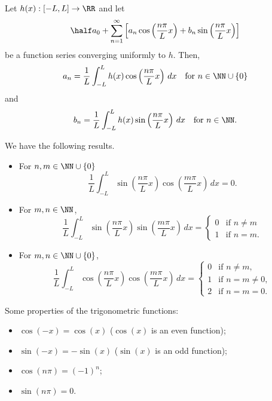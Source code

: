 \documentclass[12pt, a4paper]{article}
\begin{document}
\begin{proposition}
    Let \(h(x) : [-L,L] \to \RR\) and let 
    \[\half a_0 + \sum_{n=1}^{\infty} \left[ a_n \cos\left( \frac{n\pi}{L}x \right)+ b_n \sin \left( \frac{n\pi}{L}x \right) \right]\]
    be a function series converging uniformly to \(h\). Then,
    \[a_n = \frac{1}{L} \int_{-L}^L h(x) \cos\left( \frac{n\pi}{L}x \right) \, dx \quad \text{for } n \in \NN \cup \{0\}\]
    and
    \[b_n =\frac{1}{L} \int_{-L}^L h(x) \sin \left( \frac{n\pi}{L}x \right) \, dx \quad \text{for } n \in \NN.\]
\end{proposition}

\begin{mdlemma}
    We have the following results.
    \begin{itemize}
        \item For \(n,m \in \NN \cup \{0\}\)
        \[\frac{1}{L} \int_{-L}^L \sin \left( \frac{n\pi}{L}x \right) \cos\left( \frac{m\pi}{L}x \right) \, dx =0.\]
        \item For \(m,n \in \NN\),
        \[\frac{1}{L} \int_{-L}^{L} \sin\left( \frac{n\pi}{L}x\right)\sin\left( \frac{m\pi}{L}x \right) \, dx= \begin{cases}
            0 & \text{if } n\neq m \\
            1 & \text{if } n=m.
        \end{cases}\]
        \item For \(m,n \in \NN \cup \{0\}\),
        \[\frac{1}{L} \int_{-L}^{L} \cos\left( \frac{n\pi}{L}x \right) \cos\left( \frac{m\pi}{L}x \right) \, dx =\begin{cases}
            0 & \text{if } n\neq m, \\
            1 & \text{if } n=m\neq 0, \\
            2 & \text{if } n=m=0.
        \end{cases}\]
    \end{itemize}
\end{mdlemma}

\begin{mdlemma}
    Some properties of the trigonometric functions:
    \begin{itemize}
        \item \(\cos(-x)=\cos(x)\) (\(\cos(x)\) is an even function);
        \item \(\sin(-x)=-\sin(x)\) (\(\sin(x)\) is an odd function);
        \item \(\cos(n\pi)=(-1)^n\);
        \item \(\sin(n\pi)=0\).
    \end{itemize}
\end{mdlemma}
\end{document}
